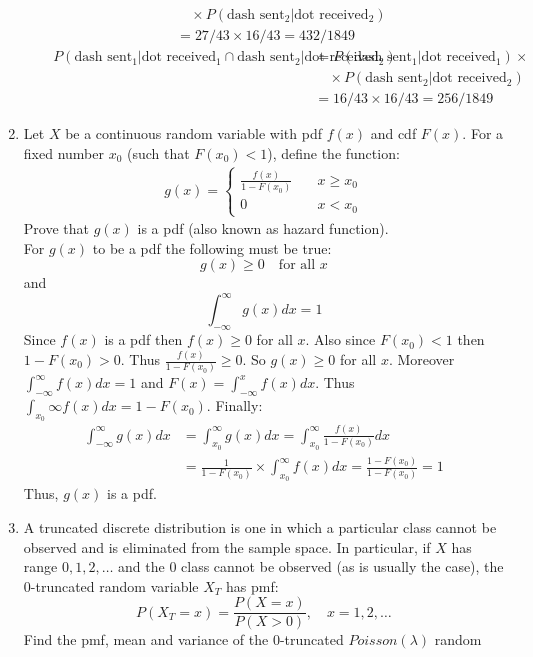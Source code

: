 \documentclass[a4paper]{article}
\begin{document}
\begin{enumerate}
\begin{enumerate}
\begin{align}
      &\quad\times P(\text{dash sent}_2|\text{dot received}_2)\nonumber\\
      &=27/43\times16/43=432/1849
      \end{align}
      \begin{align}
      P(\text{dash sent}_1|\text{dot received}_1\cap\text{dash sent}_2|\text{dot
      received}_2)&=P(\text{dash sent}_1|\text{dot received}_1)\times\nonumber\\
      &\quad\times P(\text{dash sent}_2|\text{dot received}_2)\nonumber\\
      &=16/43\times16/43=256/1849
      \end{align}
    \end{enumerate}
  \item Let $X$ be a continuous random variable with pdf $f(x)$ and cdf $F(x)$.
  For a fixed number $x_0$ (such that $F(x_0)<1$), define the function:
    \begin{align} g(x)=
      \begin{cases}
        \frac{f(x)}{1-F(x_0)} \quad &x\geq x_0 \\
        0 \quad &x<x_0
      \end{cases}
    \end{align}
  Prove that $g(x)$ is a pdf (also known as hazard function).\\
  For $g(x)$ to be a pdf the following must be true:
  $$g(x)\geq0\quad \text{for all }x$$
  and
  $$\int_{-\infty}^{\infty}g(x)dx=1$$
  Since $f(x)$ is a pdf then $f(x)\geq0$ for all $x$. Also since $F(x_0)<1$ then
  $1-F(x_0)>0$. Thus $\frac{f(x)}{1-F(x_0)}\geq0$. So $g(x)\geq0$ for all $x$.
  Moreover $\int_{-\infty}^{\infty}f(x)dx=1$ and
  $F(x)=\int_{-\infty}^{x}f(x)dx$. Thus $\int_{x_0}{\infty}f(x)dx=1-F(x_0)$.
  Finally:
  \begin{align}
  \int_{-\infty}^{\infty}g(x)dx&=\int_{x_0}^{\infty}g(x)dx=\int_{x_0}^{\infty}\frac{f(x)}{1-F(x_0)}dx\nonumber\\
  &=\frac{1}{1-F(x_0)}\times\int_{x_0}^{\infty}f(x)dx=\frac{1-F(x_0)}{1-F(x_0)}=1
  \end{align}
  Thus, $g(x)$ is a pdf.
  \item A truncated discrete distribution is one in which a particular class
  cannot be observed and is eliminated from the sample space. In particular, if
  $X$ has range $0,1,2,\ldots$ and the $0$ class cannot be observed (as is
  usually the case), the $0$-truncated random variable $X_T$ has pmf:
  $$P(X_T=x)=\frac{P(X=x)}{P(X>0)}, \quad x=1,2,\ldots$$
  Find the pmf, mean and variance of the $0$-truncated $Poisson(\lambda)$ random

\end{enumerate}
\end{document}
